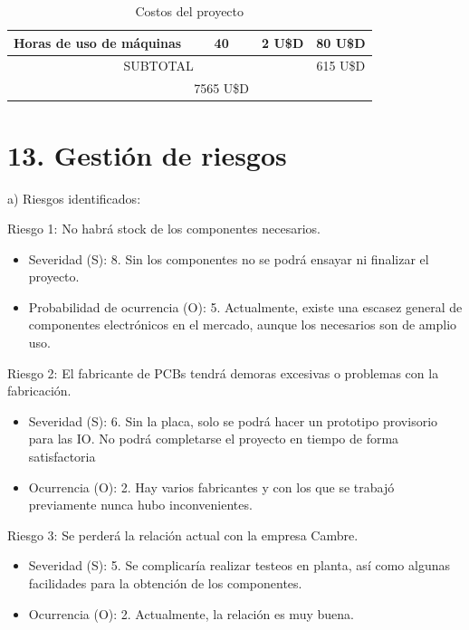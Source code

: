 \documentclass[
11pt, %
codirector, %
]{charter}
\begin{document}
\begin{table}[htpb]
\begin{tabularx}{\linewidth}{@{}|X|c|r|r|@{}}
Horas de uso de máquinas &
  \multicolumn{1}{c|}{40} &
  \multicolumn{1}{c|}{2 U\$D} &
  \multicolumn{1}{c|}{80 U\$D} \\ \hline 

\multicolumn{3}{|c|}{SUBTOTAL} &
  \multicolumn{1}{c|}{615 U\$D} \\ \hline
\rowcolor[HTML]{C0C0C0}
\multicolumn{3}{|c|}{TOTAL} &
\multicolumn{1}{c|}{7565 U\$D}
   \\ \hline
\end{tabularx}%
\caption{Costos del proyecto}
\label{tab:costosProyecto}
\end{table}

\section{13. Gestión de riesgos}
\label{sec:riesgos}

a) Riesgos identificados:

Riesgo 1: No habrá stock de los componentes necesarios.
\begin{itemize}
	\item Severidad (S): 8. Sin los componentes no se podrá ensayar ni finalizar el proyecto.
	\item Probabilidad de ocurrencia (O): 5. Actualmente, existe una escasez general de componentes electrónicos en el mercado, aunque los necesarios son de amplio uso. 
\end{itemize}   

Riesgo 2: El fabricante de PCBs tendrá demoras excesivas o problemas con la fabricación.
\begin{itemize}
	\item Severidad (S): 6. Sin la placa, solo se podrá hacer un prototipo provisorio para las IO. No podrá completarse el proyecto en tiempo de forma satisfactoria
	\item Ocurrencia (O): 2. Hay varios fabricantes y con los que se trabajó previamente nunca hubo inconvenientes.
\end{itemize}

Riesgo 3: Se perderá la relación actual con la empresa Cambre.
\begin{itemize}
	\item Severidad (S): 5. Se complicaría realizar testeos en planta, así como algunas facilidades para la obtención de los componentes.
	\item Ocurrencia (O): 2. Actualmente, la relación es muy buena.
\end{itemize}
\end{document}
